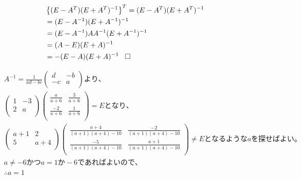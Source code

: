 \documentclass[dvipdfmx,uplatex]{jsarticle}
\begin{document}
  \begin{equation}
    \begin{aligned}
        &\left\{ (E-A^{T})(E+A^{T})^{-1} \right\}^{T} = (E-A^{T})(E+A^{T})^{-1}\nonumber\\
        &=(E-A^{-1})(E+A^{-1})^{-1}\nonumber\\
        &=(E-A^{-1})AA^{-1}(E+A^{-1})^{-1}\nonumber\\
        &=(A-E)(E+A)^{-1}\nonumber\\
        &=-(E-A)(E+A)^{-1} \hspace{3mm}\square\nonumber\\
    \end{aligned}
  \end{equation}

  \begin{equation}
    \begin{aligned}
        &A^{-1} = \frac{1}{ad-bc}\begin{pmatrix} d & -b\\ -c & a\\ \end{pmatrix}より、\\
        &\begin{pmatrix} 1 & -3\\ 2 & a\\ \end{pmatrix} \begin{pmatrix} \frac{a}{a+6} & \frac{3}{a+6}\\ \frac{-2}{a+6} & \frac{1}{a+6}\\ \end{pmatrix} = Eとなり、\nonumber\\
        &\begin{pmatrix} a+1 & 2\\ 5 & a+4\\ \end{pmatrix} \begin{pmatrix} \frac{a+4}{(a+1)(a+4)-10} & \frac{-2}{(a+1)(a+4)-10}\\ \frac{-5}{(a+1)(a+4)-10} & \frac{a+1}{(a+1)(a+4)-10}\\ \end{pmatrix} \neq Eとなるようなaを探せばよい。\nonumber\\
        &a \neq -6 かつ a = 1か-6であればよいので、\nonumber\\
        &\therefore a=1\nonumber\\
    \end{aligned}
  \end{equation}
\end{document}
